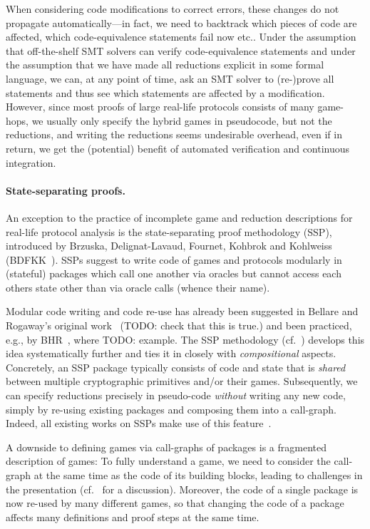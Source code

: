 When considering code modifications to correct errors, these changes do not
propagate automatically---in fact, we need to backtrack which pieces
of code are affected, which code-equivalence statements fail now etc..
Under the assumption that off-the-shelf SMT solvers can verify
code-equivalence statements and under the assumption that we have
made all reductions explicit in some formal language, we can, at 
any point of time, ask an SMT solver to (re-)prove all statements and thus see which
statements are affected by a modification. However, since most proofs
of large real-life protocols consists of many game-hops, we usually only
specify the hybrid games in pseudocode, but not the reductions, and
writing the reductions seems undesirable overhead, even if in return, we
get the (potential) benefit of automated verification and continuous 
integration.

\paragraph{State-separating proofs.}
An exception to the practice of incomplete game and reduction descriptions for
real-life protocol analysis is the state-separating proof methodology (SSP),
introduced by Brzuska, Delignat-Lavaud, Fournet, Kohbrok and Kohlweiss (BDFKK~\cite{X}). SSPs suggest to write code of games and protocols modularly in (stateful) packages which call one another via oracles but cannot access each others state other than
via oracle calls (whence their name). 

Modular code writing and code re-use has already been suggested in Bellare and Rogaway's original work~\cite{X} (TODO: check that this is true.) and been practiced, e.g., by BHR~\cite{X}, where TODO: example.
The SSP methodology (cf.~\cite{X,Y,Z}) develops this idea systematically further and ties it in closely with \emph{compositional} aspects. Concretely, an SSP package typically consists of code and state that is \emph{shared} between multiple cryptographic primitives and/or their games. Subsequently, we can specify reductions precisely in pseudo-code \emph{without} writing any new code, simply by re-using existing packages and composing them into a call-graph. Indeed, all existing works on SSPs make use of this feature~\cite{blankedcite}.

A downside to defining games via call-graphs of packages is a fragmented
description of games: To fully understand a game, we need to consider the
call-graph at the same time as the code of its building blocks, leading
to challenges in the presentation (cf.~\cite{ACNS:BEP24} for a discussion).
Moreover, the code of a single package is now re-used by many different games, 
so that changing the code of a package affects many definitions and proof 
steps at the same time.

